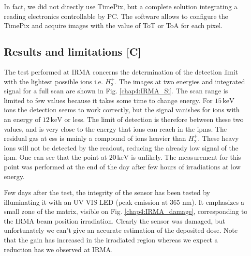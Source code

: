 \begin{refsection}
  In fact, we did not directly use TimePix, but a complete solution \cite{Kraus2011,advacam2019} integrating a reading electronics controllable by PC. The software allows to configure the TimePix and acquire images with the value of ToT or ToA for each pixel.

  \subsection{Results and limitations [C]}

  The test performed at IRMA concerns the determination of the detection limit with the lightest possible ions i.e. $H_{2}^{+}$. The images at two energies and integrated signal for a full scan are shown in Fig. \ref{chap4:IRMA_Si}. The scan range is limited to few values because it takes some time to change energy. For $15\,\mathrm{keV}$ ions the detection seems to work correctly, but the signal vanishes for ions with an energy of $12\,\mathrm{keV}$ or less. The limit of detection is therefore between these two values, and is very close to the energy that ions can reach in the \acrshort{ipm}s. The residual gas at \acrshort{ess} is mainly a compound of ions heavier than $H_{2}^{+}$. These heavy ions will not be detected by the readout, reducing the already low signal of the \acrshort{ipm}. One can see that the point at $20\,\mathrm{keV}$ is unlikely. The measurement for this point was performed at the end of the day after few hours of irradiations at low energy.

  

  
  Few days after the test, the integrity of the sensor has been tested by illuminating it with an UV-VIS LED (peak emission at 365 nm). It emphasizes a small zone of the matrix, visible on Fig. \ref{chap4:IRMA_damage}, corresponding to the IRMA beam position irradiation. Clearly the sensor was damaged, but unfortunately we can't give an accurate estimation of the deposited dose. Note that the gain has increased in the irradiated region whereas we expect a reduction has we observed at IRMA.


\end{refsection}
